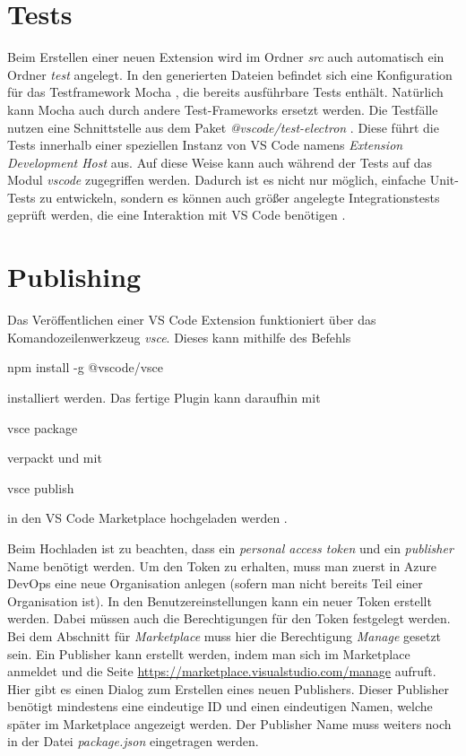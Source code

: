\section{Tests}
\label{sec:EntwicklungVsCode_Tests}

Beim Erstellen einer neuen Extension wird im Ordner \emph{src} 
auch automatisch ein Ordner \emph{test} angelegt. 
In den generierten Dateien befindet sich 
eine Konfiguration für das Test\-framework Mocha \cite{MochaJSWebsite}, 
die bereits ausführbare Tests enthält. Natürlich
kann Mocha auch durch andere Test-Frameworks ersetzt werden. 
Die Testfälle nutzen eine Schnittstelle
aus dem Paket \emph{@vscode/test-electron} \cite{VSCodeTestElectronGithub}. 
Diese führt die Tests
innerhalb einer speziellen Instanz von VS Code namens 
\emph{Extension Development Host} aus. Auf diese Weise kann auch
während der Tests auf das Modul \emph{vscode} zugegriffen werden.
Dadurch ist es nicht nur möglich, einfache Unit-Tests zu entwickeln, 
sondern es können auch größer angelegte Integrationstests
geprüft werden, die eine Interaktion mit VS Code benötigen 
\cite{VSCodeExtensionAPITestingExtensions}.

\section{Publishing}
\label{sec:EntwicklungVsCode_Publishing}

Das Veröffentlichen einer VS Code Extension funktioniert über das 
Komandozeilenwerkzeug \emph{vsce}. Dieses kann mithilfe des Befehls
\begin{GenericCode}[numbers=none]
npm install -g @vscode/vsce
\end{GenericCode}
installiert werden. Das fertige Plugin kann daraufhin mit 
\begin{GenericCode}[numbers=none]
vsce package
\end{GenericCode}
verpackt und mit 
\begin{GenericCode}[numbers=none]
vsce publish
\end{GenericCode}
in den VS Code Marketplace hochgeladen werden \cite{VSCodeExtensionAPIPublishingExtension}.

Beim Hochladen ist zu beachten, dass ein \emph{personal access token}
und ein \emph{publisher} Name benötigt werden.
Um den Token zu erhalten, muss man zuerst in Azure DevOps eine neue Organisation
anlegen (sofern man nicht bereits Teil einer Organisation ist). In den 
Benutzereinstellungen kann ein neuer Token erstellt werden. Dabei müssen auch die 
Berechtigungen für den Token festgelegt werden. Bei dem Abschnitt für 
\emph{Marketplace} muss hier die Berechtigung \emph{Manage} gesetzt sein.
Ein Publisher kann erstellt werden, indem man sich im Marketplace anmeldet
und die Seite \url{https://marketplace.visualstudio.com/manage} aufruft.
Hier gibt es einen Dialog zum Erstellen eines neuen Publishers. Dieser
Publisher benötigt mindestens eine eindeutige ID und einen eindeutigen
Namen, welche später im Marketplace angezeigt werden. Der Publisher Name
muss weiters noch in der Datei \emph{package.json} eingetragen werden.

